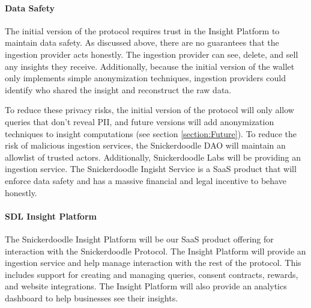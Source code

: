 \paragraph{Data Safety}
\label{section:IngestionDataSafety}

The initial version of the protocol requires trust in the Insight Platform to maintain data safety. As discussed above, there are no guarantees that the 
ingestion provider acts honestly. The ingestion provider can see, delete, and sell any insights they receive. Additionally, because the initial version 
of the wallet only implements simple anonymization techniques, ingestion providers could identify who shared the insight and reconstruct the raw data. 


To reduce these privacy risks, the initial version of the protocol will only allow queries that don't reveal PII, and future versions will add anonymization 
techniques to insight computations (see section \ref{section:Future}). To reduce the risk of malicious ingestion services, the Snickerdoodle DAO will maintain 
an allowlist of trusted actors. Additionally, Snickerdoodle Labs will be providing an ingestion service. The Snickerdoodle Ingisht Service is a SaaS product 
that will enforce data safety and has a massive financial and legal incentive to behave honestly.

\paragraph{SDL Insight Platform}
\label{section:InsightService}

The Snickerdoodle Insight Platform will be our SaaS product offering for interaction with the Snickerdoodle Protocol. The Insight Platform will provide an 
ingestion service and help manage interaction with the rest of the protocol. This includes support for creating and managing queries, consent contracts, 
rewards, and website integrations. The Insight Platform will also provide an analytics dashboard to help businesses see their insights.